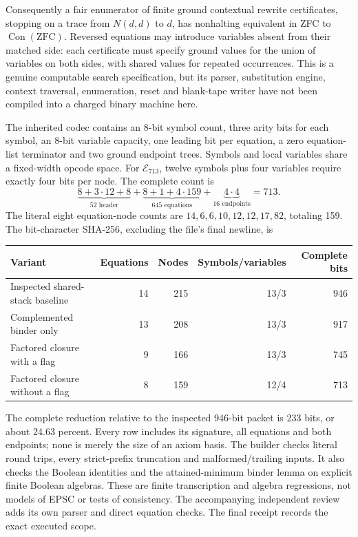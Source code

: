 Consequently a fair enumerator of finite ground contextual rewrite
certificates, stopping on a trace from $N(d,d)$ to $d$, has nonhalting
equivalent in ZFC to $\operatorname{Con}(\mathrm{ZFC})$. Reversed equations
may introduce variables absent from their matched side: each certificate
must specify ground values for the union of variables on both sides,
with shared values for repeated occurrences. This is a genuine
computable search specification, but its parser, substitution engine,
context traversal, enumeration, reset and blank-tape writer have not
been compiled into a charged binary machine here.

The inherited codec contains an 8-bit symbol count, three arity bits for
each symbol, an 8-bit variable capacity, one leading bit per equation,
a zero equation-list terminator and two ground endpoint trees. Symbols
and local variables share a fixed-width opcode space. For $\mathcal E_{713}$,
twelve symbols plus four variables require exactly four bits per node.
The complete count is
\[
 \underbrace{8+3\cdot12+8}_{52\text{ header}}
 +\underbrace{8+1+4\cdot159}_{645\text{ equations}}
 +\underbrace{4\cdot4}_{16\text{ endpoints}}=713.
\]
The literal eight equation-node counts are
$14,6,6,10,12,12,17,82$, totaling 159.
The bit-character SHA-256, excluding the file's final newline, is

\begin{center}
\begin{tabular}{lrrrr}
\hline
Variant&Equations&Nodes&Symbols/variables&Complete bits\\\hline
Inspected shared-stack baseline&14&215&13/3&946\\
Complemented binder only&13&208&13/3&917\\
Factored closure with a flag&9&166&13/3&745\\
Factored closure without a flag&8&159&12/4&713\\\hline
\end{tabular}
\end{center}

The complete reduction relative to the inspected 946-bit packet is 233
bits, or about 24.63 percent. Every row includes its signature, all
equations and both endpoints; none is merely the size of an axiom basis.
The builder checks literal round trips, every strict-prefix truncation
and malformed/trailing inputs. It also checks the Boolean identities and
the attained-minimum binder lemma on explicit finite Boolean algebras.
These are finite transcription and algebra regressions, not models of
EPSC or tests of consistency. The accompanying independent review adds
its own parser and direct equation checks. The final receipt records the
exact executed scope.


